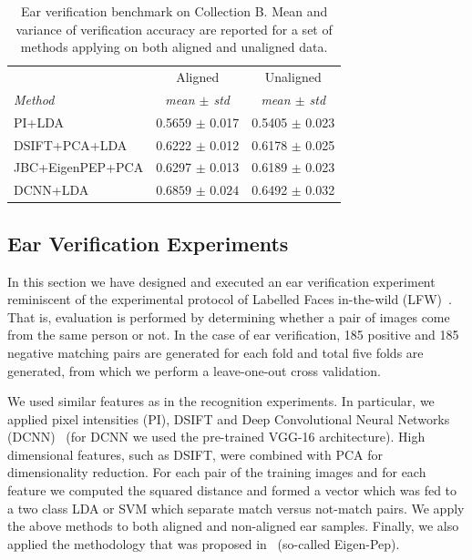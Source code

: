 {    \begin{table}
    \centering
    
    \begin{tabular}{|l|c|c|}
    \hline
    
                            &   Aligned             &   Unaligned  \\
    \emph{Method}    & \emph{mean $\pm$ std} & \emph{mean $\pm$ std} \\
    \hline\hline
    PI+LDA           & 0.5659 $\pm$ 0.017    & 0.5405 $\pm$ 0.023 \\
    DSIFT+PCA+LDA    & 0.6222 $\pm$ 0.012    & 0.6178 $\pm$ 0.025 \\
    JBC+EigenPEP+PCA & 0.6297 $\pm$ 0.013    & 0.6189 $\pm$ 0.023 \\
    DCNN+LDA         & $\bm{0.6859}$ $\pm$ $\bm{0.024}$    & 0.6492 $\pm$ 0.032 \\
    \hline
    \end{tabular}
    \caption{Ear verification benchmark on Collection B. Mean and variance of verification accuracy are reported for a set of methods applying on both aligned and unaligned data.}
    \label{tab:ear_verification_benchmark}
    \end{table}
}


\subsection{Ear Verification Experiments}

In this section we have designed and executed an ear verification experiment reminiscent of the experimental protocol of Labelled Faces in-the-wild (LFW)~\cite{huang2007labeled}.  That is, evaluation is performed by determining whether a pair of images come from the same person or not. In the case of ear verification, 185 positive and 185 negative matching pairs are generated for each fold and total five folds are generated, from which we perform a leave-one-out cross validation.

We used similar features as in the recognition experiments. In particular, we applied pixel intensities (PI), DSIFT and Deep Convolutional Neural Networks (DCNN)~\cite{simonyan2014very} (for DCNN we used the pre-trained VGG-16 architecture). High dimensional features, such as DSIFT, were combined with PCA for dimensionality reduction. For each pair of the training images and for each feature we computed the squared distance and formed a vector which was fed to a two class LDA or SVM which separate match versus not-match pairs. We apply the above methods to both aligned and non-aligned ear samples. Finally, we also applied the methodology that was proposed in~\cite{li2014eigen} (so-called Eigen-Pep).


